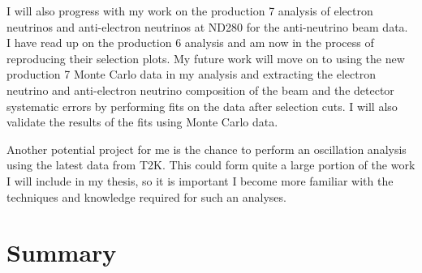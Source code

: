 \documentclass[aps,pra,12pt,notitlepage,tightenlines]{revtex4-1}
\begin{document}
I will also progress with my work on the production 7 analysis of electron neutrinos and anti-electron neutrinos at ND280 for the anti-neutrino beam data. I have read up on the production 6 analysis and am now in the process of reproducing their selection plots. My future work will move on to using the new production 7 Monte Carlo data in my analysis and extracting the electron neutrino and anti-electron neutrino composition of the beam and the detector systematic errors by performing fits on the data after selection cuts. I will also validate the results of the fits using Monte Carlo data.

Another potential project for me is the chance to perform an oscillation analysis using the latest data from T2K. This could form quite a large portion of the work I will include in my thesis, so it is important I become more familiar with the techniques and knowledge required for such an analyses.

\section{Summary}



\end{document}
